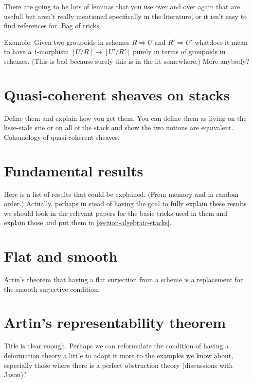 \noindent
There are going to be lots of lemmas that you use over and over again
that are usefull but aren't really mentioned specifically in the literature,
or it isn't easy to find references for. Bag of tricks.

\medskip\noindent
Example: Given two groupoids in schemes $R\Rightarrow U$ and
$R' \Rightarrow U'$ whatdoes it mean to have a $1$-morphism
$[U/R] \to [U'/R']$ purely in terms of groupoids in schemes.
(This is bad because surely this is in the lit somewhere.) 
More anybody?

\section{Quasi-coherent sheaves on stacks}
\label{section-quasi-coherent}

\noindent
Define them and explain how you get them. You can define them as living on the 
lisse-etale site or on all of the stack and show the two notions are 
equivalent. Cohomology of quasi-coherent sheaves.

\section{Fundamental results}
\label{section-results-fundamental}

\noindent
Here is a list of results that could be explained. (From memory and in 
random order.) Actually, perhaps in stead of having the goal to fully explain
these results we should look in the relevant papers for the basic tricks 
used in them and explain those and put them in 
\ref{section-algebraic-stacks}.

\section{Flat and smooth} 
\label{section-flat-smooth}

\noindent
Artin's theorem that having a flat surjection from a scheme is a replacement 
for the smooth surjective condition.

\section{Artin's representability theorem} 
\label{section-representability}

\noindent
Title is clear enough. Perhaps we can reformulate the condition of having a
deformation theory a little to adapt it more to the examples we know about,
especially those where there is a perfect obstruction theory (discussions 
with Jason)?

